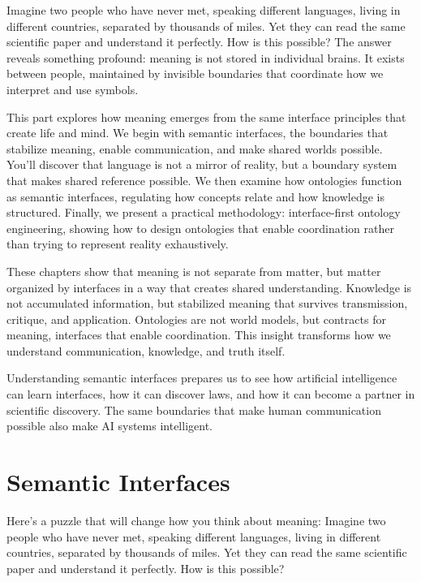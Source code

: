 \documentclass[
  openright]{book}
\begin{document}
Imagine two people who have never met, speaking different languages,
living in different countries, separated by thousands of miles. Yet they
can read the same scientific paper and understand it perfectly. How is
this possible? The answer reveals something profound: meaning is not
stored in individual brains. It exists between people, maintained by
invisible boundaries that coordinate how we interpret and use symbols.

This part explores how meaning emerges from the same interface
principles that create life and mind. We begin with semantic interfaces,
the boundaries that stabilize meaning, enable communication, and make
shared worlds possible. You'll discover that language is not a mirror of
reality, but a boundary system that makes shared reference possible. We
then examine how ontologies function as semantic interfaces, regulating
how concepts relate and how knowledge is structured. Finally, we present
a practical methodology: interface-first ontology engineering, showing
how to design ontologies that enable coordination rather than trying to
represent reality exhaustively.

These chapters show that meaning is not separate from matter, but matter
organized by interfaces in a way that creates shared understanding.
Knowledge is not accumulated information, but stabilized meaning that
survives transmission, critique, and application. Ontologies are not
world models, but contracts for meaning, interfaces that enable
coordination. This insight transforms how we understand communication,
knowledge, and truth itself.

Understanding semantic interfaces prepares us to see how artificial
intelligence can learn interfaces, how it can discover laws, and how it
can become a partner in scientific discovery. The same boundaries that
make human communication possible also make AI systems intelligent.

\chapter{\texorpdfstring{Semantic
Interfaces}{Semantic Interfaces}}\label{semantic-interfaces}

Here's a puzzle that will change how you think about meaning: Imagine
two people who have never met, speaking different languages, living in
different countries, separated by thousands of miles. Yet they can read
the same scientific paper and understand it perfectly. How is this
possible?
\end{document}
